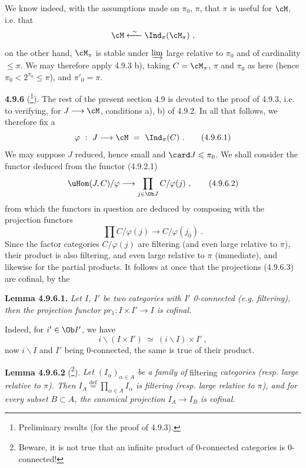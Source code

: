 We know indeed, with the assumptions made on $\pi_0$, $\pi$, that $\pi$ is useful for $\cM$, i.e. that
\[
\cM \xleftarrow{\ \sim\ } \Ind_\pi(\cM_\pi) \ ,
\]
on the other hand, $\cM_\pi$ is stable under $\varinjlim$ large relative to $\pi_0$ and of cardinality $\leqslant \pi$. We may therefore apply 4.9.3 b), taking $C = \cM_\pi$, $\pi$ and $\pi_0$ as here (hence $\pi_0 < 2^{\pi_0} \leqslant \pi$), and $\pi'_0 = \pi$.


\textbf{4.9.6} (\footnote[96]{Preliminary results (for the proof of 4.9.3).}). The rest of the present section 4.9 is devoted to the proof of 4.9.3, i.e. to verifying, for $J \longrightarrow \cM$, conditions a), b) of 4.9.2. In all that follows, we therefore fix a
\[
\varphi \ : \ J \longrightarrow \cM \ = \ \Ind_\pi(C) \ . \tag*{(4.9.6.1)}
\]
We may suppose $J$ reduced, hence small and $\card J \leqslant \pi_0$. We shall consider the functor deduced from the functor (4.9.2.1)
\[
\uHom(J,C)/\varphi \longrightarrow \prod_{j \in \Ob J} C/\varphi(j) \ , \tag*{(4.9.6.2)}
\]
from which the functors in question are deduced by composing with the projection functors
\[
\prod C/\varphi(j) \longrightarrow C/\varphi(j_0) \ . \tag*{(4.9.6.3)}
\]
Since the factor categories $C/\varphi(j)$ are filtering (and even large relative to $\pi$), their product is also filtering, and even large relative to $\pi$ (immediate), and likewise
for the partial products. It follows at once that the projections (4.9.6.3) are cofinal, by the

\textbf{Lemma 4.9.6.1.} \textit{Let $I$, $I'$ be two categories with $I'$ \textup{0}-connected (e.g. filtering), then the projection functor $pr_1 : I \times I' \longrightarrow I$ is cofinal.}

Indeed, for $i' \in \Ob I'$, we have
\[
i\backslash(I \times I') \ \simeq \ (i\backslash I) \times I' \ ,
\]
now $i\backslash I$ and $I'$ being 0-connected, the same is true of their product.

\textbf{Lemma 4.9.6.2} (\footnote[97]{Beware, it is not true that an infinite product of 0-connected categories is 0-connected!}). \textit{Let $(I_\alpha)_{\alpha \in A}$ be a family of} filtering \textit{categories (resp. large relative to $\pi$). Then $I_A \stackrel{\text{def}}{=} \prod_{\alpha \in A} I_\alpha$ is filtering (resp. large relative to $\pi$), and for every subset $B \subset A$, the canonical projection $I_A \longrightarrow I_B$ is cofinal.} %


